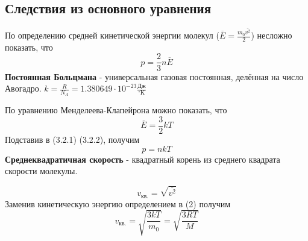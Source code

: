 \subsection{Следствия из основного уравнения}
По определению средней кинетической энергии молекул ($\displaystyle \overline{E}=\frac{m_0\overline{v^2}}{2}$) несложно показать, что 
\begin{equation}
	p = \frac{2}{3} n \overline{E}
\end{equation}
\textbf{Постоянная Больцмана} - универсальная газовая постоянная, делённая на число Авогадро. $\displaystyle k=\frac{R}{N_A}=1.380649\cdot10^{-23} \textstyle \frac{\text{Дж}}{^\circ \text{K}}$\par
По уравнению Менделеева-Клапейрона можно показать, что
\begin{equation}
	\overline{E}=\frac{3}{2}kT
\end{equation}
Подставив в (3.2.1) (3.2.2), получим
\begin{equation*}
	p=nkT
\end{equation*}
\textbf{Среднеквадратичная скорость} - квадратный корень из среднего квадрата скорости молекулы.\par
\[v_{\text{кв.}}=\sqrt{\overline{v^2}}\]
Заменив кинетическую энергию определением в (2) получим
\begin{equation*}
	v_{\text{кв.}}=\sqrt{\frac{3kT}{m_0}}=\sqrt{\frac{3RT}{M}}
\end{equation*}



